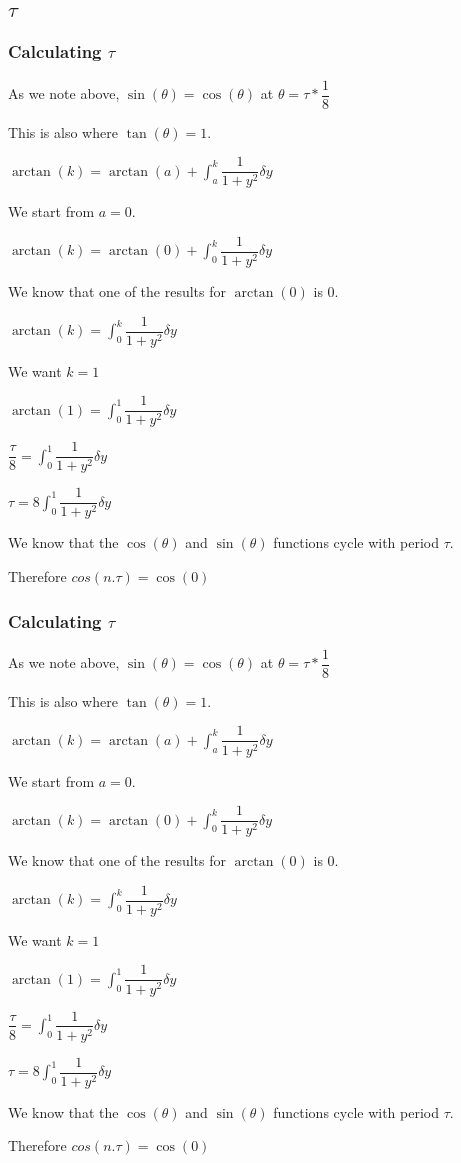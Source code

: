 
\subsection{\(\tau \)}

\subsubsection{Calculating \(\tau \)}

As we note above, \(\sin (\theta )=\cos (\theta )\) at \(\theta =\tau *\dfrac{1}{8}\)

This is also where \(\tan (\theta )=1\).

\(\arctan (k)=\arctan (a)+\int_a^k\dfrac{1}{1+y^2} \delta y\)

We start from \(a=0\).

\(\arctan (k)=\arctan (0)+\int_0^k\dfrac{1}{1+y^2} \delta y\)

We know that one of the results for \(\arctan (0)\) is \(0\).

\(\arctan (k)=\int_0^k\dfrac{1}{1+y^2} \delta y\)

We want \(k=1\)

\(\arctan (1)=\int_0^1\dfrac{1}{1+y^2} \delta y\)

\(\dfrac{\tau }{8}=\int_0^1\dfrac{1}{1+y^2} \delta y\)

\(\tau =8\int_0^1\dfrac{1}{1+y^2} \delta y\)

We know that the \(\cos (\theta )\) and \(\sin (\theta )\) functions cycle with period \(\tau \).

Therefore \(cos (n.\tau )=\cos (0)\)

\subsubsection{Calculating \(\tau \)}

As we note above, \(\sin (\theta )=\cos (\theta )\) at \(\theta =\tau *\dfrac{1}{8}\)

This is also where \(\tan (\theta )=1\).

\(\arctan (k)=\arctan (a)+\int_a^k\dfrac{1}{1+y^2} \delta y\)

We start from \(a=0\).

\(\arctan (k)=\arctan (0)+\int_0^k\dfrac{1}{1+y^2} \delta y\)

We know that one of the results for \(\arctan (0)\) is \(0\).

\(\arctan (k)=\int_0^k\dfrac{1}{1+y^2} \delta y\)

We want \(k=1\)

\(\arctan (1)=\int_0^1\dfrac{1}{1+y^2} \delta y\)

\(\dfrac{\tau }{8}=\int_0^1\dfrac{1}{1+y^2} \delta y\)

\(\tau =8\int_0^1\dfrac{1}{1+y^2} \delta y\)

We know that the \(\cos (\theta )\) and \(\sin (\theta )\) functions cycle with period \(\tau \).

Therefore \(cos (n.\tau )=\cos (0)\)

